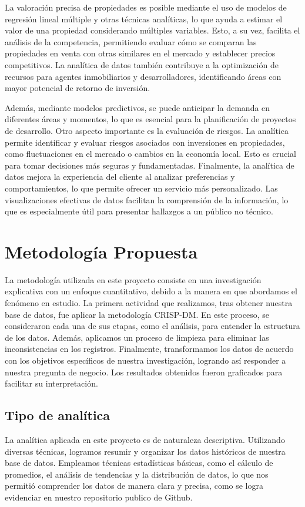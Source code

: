 \documentclass[12pt,a4paper]{article}
\begin{document}
La valoración precisa de propiedades es posible mediante el uso de modelos de regresión lineal múltiple y otras técnicas analíticas, lo que ayuda a estimar el valor de una propiedad considerando múltiples variables. Esto, a su vez, facilita el análisis de la competencia, permitiendo evaluar cómo se comparan las propiedades en venta con otras similares en el mercado y establecer precios competitivos. La analítica de datos también contribuye a la optimización de recursos para agentes inmobiliarios y desarrolladores, identificando áreas con mayor potencial de retorno de inversión.

Además, mediante modelos predictivos, se puede anticipar la demanda en diferentes áreas y momentos, lo que es esencial para la planificación de proyectos de desarrollo. Otro aspecto importante es la evaluación de riesgos. La analítica permite identificar y evaluar riesgos asociados con inversiones en propiedades, como fluctuaciones en el mercado o cambios en la economía local. Esto es crucial para tomar decisiones más seguras y fundamentadas. 
Finalmente, la analítica de datos mejora la experiencia del cliente al analizar preferencias y comportamientos, lo que permite ofrecer un servicio más personalizado. Las visualizaciones efectivas de datos facilitan la comprensión de la información, lo que es especialmente útil para presentar hallazgos a un público no técnico.

\section{Metodología Propuesta}
La metodología utilizada en este proyecto consiste en una investigación explicativa con un enfoque cuantitativo, debido a la manera en que abordamos el fenómeno en estudio. La primera actividad que realizamos, tras obtener nuestra base de datos, fue aplicar la metodología CRISP-DM. En este proceso, se consideraron cada una de sus etapas, como el análisis, para entender la estructura de los datos. Además, aplicamos un proceso de limpieza para eliminar las inconsistencias en los registros. Finalmente, transformamos los datos de acuerdo con los objetivos específicos de nuestra investigación, logrando así responder a nuestra pregunta de negocio. Los resultados obtenidos fueron graficados para facilitar su interpretación.
\subsection{Tipo de analítica}
La analítica aplicada en este proyecto es de naturaleza descriptiva. Utilizando diversas técnicas, logramos resumir y organizar los datos históricos de nuestra base de datos. Empleamos técnicas estadísticas básicas, como el cálculo de promedios, el análisis de tendencias y la distribución de datos, lo que nos permitió comprender los datos de manera clara y precisa, como se logra evidenciar en nuestro repositorio publico de Github.
\end{document}
